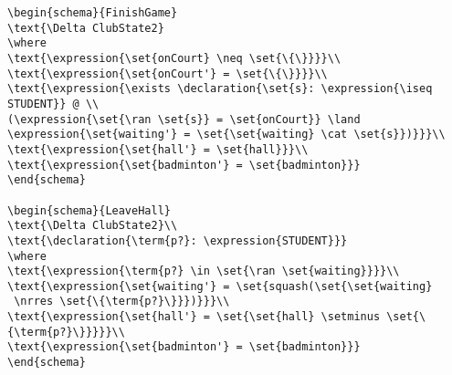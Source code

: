 \begin{verbatim}
\begin{schema}{FinishGame}
\text{\Delta ClubState2}
\where
\text{\expression{\set{onCourt} \neq \set{\{\}}}}\\
\text{\expression{\set{onCourt'} = \set{\{\}}}}\\
\text{\expression{\exists \declaration{\set{s}: \expression{\iseq STUDENT}} @ \\
(\expression{\set{\ran \set{s}} = \set{onCourt}} \land 
\expression{\set{waiting'} = \set{\set{waiting} \cat \set{s}})}}}\\
\text{\expression{\set{hall'} = \set{hall}}}\\
\text{\expression{\set{badminton'} = \set{badminton}}}
\end{schema}

\begin{schema}{LeaveHall}
\text{\Delta ClubState2}\\
\text{\declaration{\term{p?}: \expression{STUDENT}}}
\where
\text{\expression{\term{p?} \in \set{\ran \set{waiting}}}}\\
\text{\expression{\set{waiting'} = \set{squash(\set{\set{waiting}
 \nrres \set{\{\term{p?}\}}})}}}\\
\text{\expression{\set{hall'} = \set{\set{hall} \setminus \set{\{\term{p?}\}}}}}\\
\text{\expression{\set{badminton'} = \set{badminton}}}
\end{schema}


\end{verbatim}